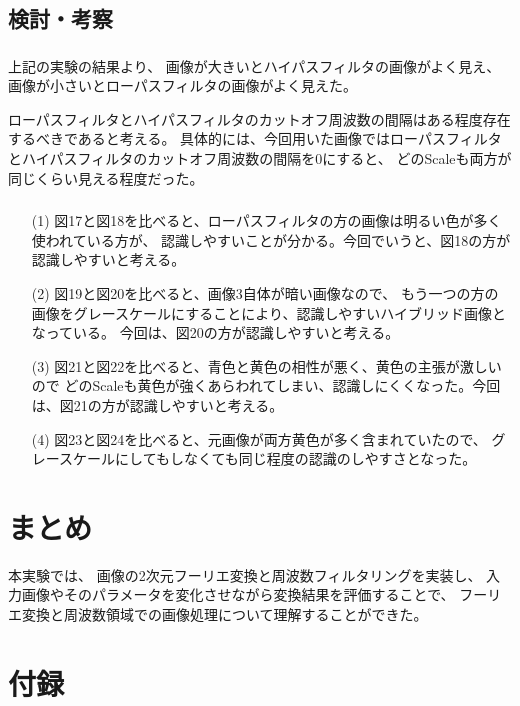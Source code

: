 \documentclass[12pt]{jarticle}
\begin{document}
\subsection{検討・考察}

\subsubsection{}
上記の実験の結果より、
画像が大きいとハイパスフィルタの画像がよく見え、画像が小さいとローパスフィルタの画像がよく見えた。

ローパスフィルタとハイパスフィルタのカットオフ周波数の間隔はある程度存在するべきであると考える。
具体的には、今回用いた画像ではローパスフィルタとハイパスフィルタのカットオフ周波数の間隔を0にすると、
どのScaleも両方が同じくらい見える程度だった。

\subsubsection{}
\begin{itemize}
    \item [(1)]図17と図18を比べると、ローパスフィルタの方の画像は明るい色が多く使われている方が、
          認識しやすいことが分かる。今回でいうと、図18の方が認識しやすいと考える。
    \item [(2)]図19と図20を比べると、画像3自体が暗い画像なので、
          もう一つの方の画像をグレースケールにすることにより、認識しやすいハイブリッド画像となっている。
          今回は、図20の方が認識しやすいと考える。
    \item [(3)]図21と図22を比べると、青色と黄色の相性が悪く、黄色の主張が激しいので
          どのScaleも黄色が強くあらわれてしまい、認識しにくくなった。今回は、図21の方が認識しやすいと考える。
    \item [(4)]図23と図24を比べると、元画像が両方黄色が多く含まれていたので、
          グレースケールにしてもしなくても同じ程度の認識のしやすさとなった。
\end{itemize}

\clearpage
\section{まとめ}
本実験では、
画像の2次元フーリエ変換と周波数フィルタリングを実装し、
入力画像やそのパラメータを変化させながら変換結果を評価することで、
フーリエ変換と周波数領域での画像処理について理解することができた。


\clearpage
\appendix
\section{付録}
\end{document}

